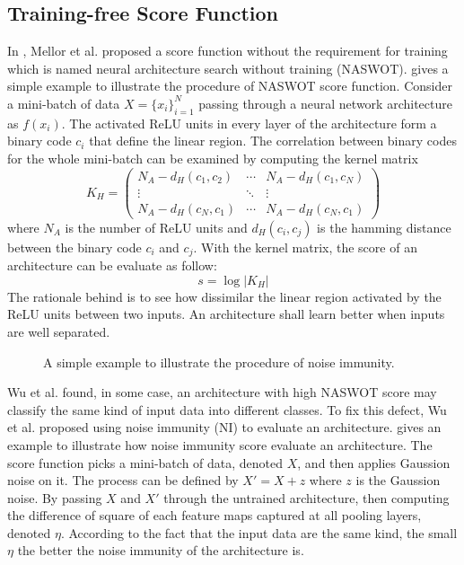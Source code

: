 \documentclass[sigconf]{acmart}
\begin{document}
    \subsection{Training-free Score Function}
    In \cite{https://doi.org/10.48550/arxiv.2006.04647}, Mellor et al. proposed a 
    score function without the requirement for training which is named neural 
    architecture search without training (NASWOT).  
	gives a simple example to illustrate the procedure of NASWOT score function. 
    Consider a mini-batch of data $X=\{x_i\}^N_{i=1}$ passing through a neural network 
    architecture as $f(x_i)$. The activated ReLU units in every layer of the architecture 
    form a binary code $c_i$ that define the linear region.
    The correlation between binary codes for the whole mini-batch can be examined 
    by computing the kernel matrix 
    \begin{equation}
        K_H=\begin{pmatrix}N_A-d_H(c_1,c_2)&\cdots&N_A-d_H(c_1,c_N)\\\vdots&\ddots&\vdots\\N_A-d_H(c_N,c_1)&\cdots&N_A-d_H(c_N,c_1)\end{pmatrix}
    \end{equation}
    where $N_A$ is the number of ReLU units and $d_H(c_i,c_j)$ is the hamming 
    distance between the binary code $c_i$ and $c_j$. 
    With the kernel matrix, the score of an architecture can be evaluate as 
    follow: 
    \begin{equation}
        s=\log\lvert K_H\rvert
    \end{equation}
    The rationale behind is to see how dissimilar the linear region activated by 
    the ReLU units between two inputs. An architecture shall learn better 
    when inputs are well separated.
	
    \begin{figure*}[htb]
        \vspace{-\baselineskip}
        \caption{A simple example to illustrate the procedure of noise immunity.}
        \label{fig:ni}
        \centering
        \vspace{-\baselineskip}
    \end{figure*}
    Wu et al. \cite{10092788} found, in some case, an architecture with high 
    NASWOT score may classify the same kind of input data into different classes. 
    To fix this defect, Wu et al. proposed using noise immunity (NI) to 
    evaluate an architecture.  gives an example to illustrate how 
    noise immunity score evaluate an architecture. The score function picks a 
    mini-batch of data, denoted $X$, and then applies Gaussion noise on it. 
    The process can be defined by $X'=X+z$ where $z$ is the Gaussion noise. 
    By passing $X$ and $X'$ through the untrained architecture, then computing 
    the difference of square of each feature maps captured at all pooling layers, 
    denoted $\eta$. According to the fact that the input data are the same kind, 
    the small $\eta$ the better the noise immunity of the architecture is.
\end{document}

